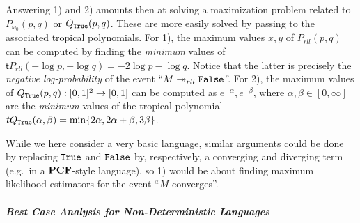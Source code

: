 Answering 1) and 2) amounts then at solving a maximization problem related to $P_{\omega_{0}}(p,q)$ or $Q_{\mathtt{True}}(p,q)$. These are more easily solved by passing to the associated tropical polynomials.
For 1), the maximum values $x,y$ of $P_{rll}(p,q)$ can be computed by finding the \emph{minimum} values of $\mathsf tP_{rll}(-\log p, -\log q)= -2\log p- \log q$. Notice that the latter is precisely the \emph{negative log-probability} of the event ``$M\twoheadrightarrow_{rll} \mathtt{False}$''. For 2), the maximum values of $Q_{\mathtt{True}}(p,q): [0,1]^{2}\to [0,1]$ can be computed as $e^{-\alpha},e^{-\beta}$, where $\alpha,\beta\in[0,\infty]$ are the \emph{minimum} values of the tropical polynomial 
$\mathsf t Q_{\true}(\alpha,\beta) = \min \{ 2\alpha, 2\alpha+\beta, 3\beta\}$.




While we here consider a very basic language, similar arguments could be done by replacing $\mathtt{True}$ and $\mathtt{False}$ by, respectively, a converging and diverging term (e.g.~in a $\mathbf{PCF}$-style language), so 1) would be about finding maximum likelihood estimators for the event ``$M$ converges''.


\subparagraph*{Best Case Analysis for Non-Deterministic Languages}

